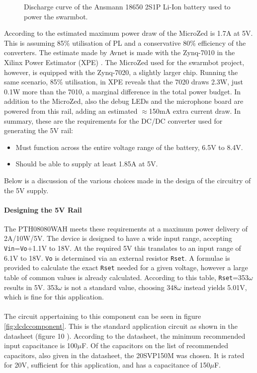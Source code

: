\begin{figure}
	\centering
	
	\caption{Discharge curve of the Ansmann 18650 2S1P Li-Ion battery used to power the swarmbot.}
	\label{fig:discharge}
\end{figure}
According to \cite{microzed_hardware_guide} the estimated maximum power draw of the MicroZed is 1.7A at 5V.
This is assuming 85\% utilisation of PL and a conservative 80\% efficiency of the converters.
The estimate made by Avnet is made with the Zynq-7010 in the Xilinx Power Estimator (XPE) \cite{xpe}.
The MicroZed used for the swarmbot project, however, is equipped with the Zynq-7020, a slightly larger chip.
Running the same scenario, 85\% utilisation, in XPE reveals that the 7020 draws 2.3W, just 0.1W more than the 7010, a marginal difference in the total power budget.
In addition to the MicroZed, also the debug LEDs and the microphone board are powered from this rail, adding an estimated $\approx$150mA extra current draw.
In summary, these are the requirements for the DC/DC converter used for generating the 5V rail:

\begin{itemize}
	\item Must function across the entire voltage range of the battery, 6.5V to 8.4V.
	\item Should be able to supply at least 1.85A at 5V.
\end{itemize}

Below is a discussion of the various choices made in the design of the circuitry of the 5V supply.

\paragraph{Designing the 5V Rail}
The PTH08080WAH \cite{pth08080} meets these requirements at a maximum power delivery of 2A/10W/5V.
The device is designed to have a wide input range, accepting \texttt{Vin}=\texttt{Vo}+1.1V to 18V.
At the required 5V this translates to an input range of 6.1V to 18V.
\texttt{Vo} is determined via an external resistor \texttt{Rset}.
A formulae is provided to calculate the exact \texttt{Rset} needed for a given voltage, however a large table of common values is already calculated.
According to this table, \texttt{Rset}=353$\omega$ results in 5V.
353$\omega$ is not a standard value, choosing 348$\omega$ instead yields 5.01V, which is fine for this application.
\\~\\
The circuit appertaining to this component can be seen in figure \ref{fig:dcdccomponent}.
This is the standard application circuit as shown in the datasheet (figure 10 \cite{pth08080}).
According to the datasheet, the minimum recommended input capacitance is 100$\mu$F. 
Of the capacitors on the list of recommended capacitors, also given in the datasheet, the 20SVP150M was chosen.
It is rated for 20V, sufficient for this application, and has a capacitance of 150$\mu$F. 

